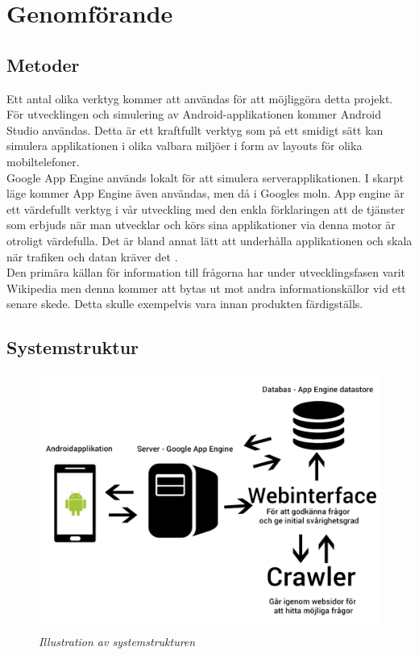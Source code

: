 \documentclass[a4paper, 11pt]{article}
\begin{document}
\section{Genomförande}

\subsection{Metoder}
Ett antal olika verktyg kommer att användas för att möjliggöra detta projekt. För utvecklingen och simulering av Android-applikationen kommer Android Studio \cite{androidstudio} användas. Detta är ett kraftfullt verktyg som på ett smidigt sätt kan simulera applikationen i olika valbara miljöer i form av layouts för olika mobiltelefoner.\\
Google App Engine används lokalt för att simulera serverapplikationen. I skarpt läge kommer App Engine även användas, men då i Googles moln. App engine är ett värdefullt verktyg i vår utveckling med den enkla förklaringen att de tjänster som erbjuds när man utvecklar och körs sina applikationer via denna motor är otroligt värdefulla. Det är bland annat lätt att underhålla applikationen och skala när trafiken och datan kräver det  \cite{googleappengine}.\\
Den primära källan för information till frågorna har under utvecklingsfasen varit Wikipedia men denna kommer att bytas ut mot andra informationskällor vid ett senare skede. Detta skulle exempelvis vara innan produkten färdigställs.\\

\subsection{Systemstruktur}

\begin{figure}[H]
	\begin{centering}
	\includegraphics[width = \textwidth]{systemstruktur.jpg} 
	\end{centering}
	\caption{\textit{Illustration av systemstrukturen}}
\end{figure} 
\end{document}

